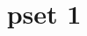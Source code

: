 \documentclass[11pt, letterpaper]{article}
\title{pset 1}
\begin{document}
\makeproblem
\end{document}
